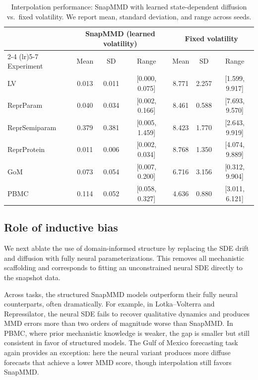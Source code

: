 \begin{table}[ht]
\centering
\caption{Interpolation performance: SnapMMD with learned state-dependent diffusion vs.\ fixed volatility. 
We report mean, standard deviation, and range across seeds.}
\label{tab:abl-fixed-interp}
\begin{tabular}{lcccccc}
\toprule
& \multicolumn{3}{c}{SnapMMD (learned volatility)} & \multicolumn{3}{c}{Fixed volatility} \\
\cmidrule(lr){2-4} \cmidrule(lr){5-7}
Experiment & Mean & SD & Range & Mean & SD & Range \\
\midrule
LV & 0.013 & 0.011 & [0.000, 0.075] & 8.771 & 2.257 & [1.599, 9.917] \\
ReprParam & 0.040 & 0.034 & [0.002, 0.166] & 8.461 & 0.588 & [7.693, 9.570] \\
ReprSemiparam & 0.379 & 0.381 & [0.005, 1.459] & 8.423 & 1.770 & [2.643, 9.919] \\
ReprProtein & 0.011 & 0.006 & [0.002, 0.034] & 8.768 & 1.350 & [4.074, 9.889] \\
GoM & 0.073 & 0.054 & [0.007, 0.200] & 6.716 & 3.156 & [0.312, 9.904] \\
PBMC & 0.114 & 0.052 & [0.058, 0.327] & 4.636 & 0.880 & [3.011, 6.121] \\
\bottomrule
\end{tabular}
\end{table}


\subsection{Role of inductive bias}
\label{app:ablations-neural}

We next ablate the use of domain-informed structure by replacing the SDE drift and diffusion with fully neural parameterizations. This removes all mechanistic scaffolding and corresponds to fitting an unconstrained neural SDE directly to the snapshot data. 

Across tasks, the structured SnapMMD models outperform their fully neural counterparts, often dramatically. 
For example, in Lotka--Volterra and Repressilator, the neural SDE fails to recover qualitative dynamics and produces MMD errors more than two orders of magnitude worse than SnapMMD. 
In PBMC, where prior mechanistic knowledge is weaker, the gap is smaller but still consistent in favor of structured models. 
The Gulf of Mexico forecasting task again provides an exception: here the neural variant produces more diffuse forecasts that achieve a lower MMD score, though interpolation still favors SnapMMD. 

